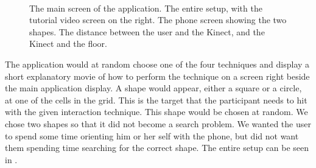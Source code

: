 \begin{figure}[H]
	\centering
	 \\
	\caption{
		\protect{} The main screen of the application.
		\protect{} The entire setup, with the tutorial video screen on the right.
		\protect{} The phone screen showing the two shapes.
		\protect{} The distance between the user and the Kinect, and the Kinect and the floor.
	}
	\label{fig:allSetup}
\end{figure}

The application would at random choose one of the four techniques and display a short explanatory movie of how to perform the technique on a screen right beside the main application display. 
A shape would appear, either a square or a circle, at one of the cells in the grid. This is the target that the participant needs to hit with the given interaction technique. This shape would be chosen at random. We chose two shapes so that it did not become a search problem. We wanted the user to spend some time orienting him or her self with the phone, but did not want them spending time searching for the correct shape. The entire setup can be seen in .

